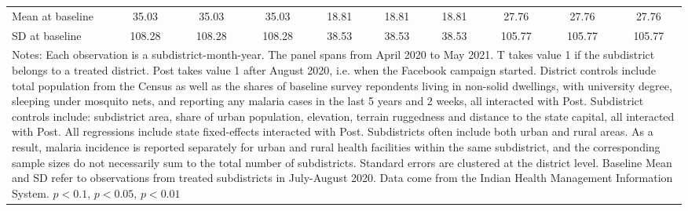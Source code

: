 {{\begin{tabular}{l*{9}{c}}
Mean at baseline&    35.03         &    35.03         &    35.03         &    18.81         &    18.81         &    18.81         &    27.76         &    27.76         &    27.76         \\
SD at baseline  &   108.28         &   108.28         &   108.28         &    38.53         &    38.53         &    38.53         &   105.77         &   105.77         &   105.77         \\
\hline\hline
\multicolumn{10}{p{0.92\linewidth}}{\scriptsize Notes: Each observation is a subdistrict-month-year. The panel spans from April 2020 to May 2021. T takes value 1 if the subdistrict belongs to a treated district. Post takes value 1 after August 2020, i.e. when the Facebook campaign started.  District controls include total population from the Census as well as the shares of baseline survey repondents living in non-solid dwellings, with university degree, sleeping under mosquito nets, and reporting any malaria cases in the last 5 years and 2 weeks, all interacted with Post. Subdistrict controls include: subdistrict area, share of urban population, elevation, terrain ruggedness and distance to the state capital, all interacted with Post. All regressions include state fixed-effects interacted with Post. Subdistricts often include both urban and rural areas. As a result, malaria incidence is reported separately for urban and rural health facilities within the same subdistrict, and the corresponding sample sizes do not necessarily sum to the total number of subdistricts. Standard errors are clustered at the district level. Baseline Mean and SD refer to observations from treated subdistricts in July-August 2020. Data come from the Indian Health Management Information System. \sym{*} \(p<0.1\), \sym{**} \(p<0.05\), \sym{***} \(p<0.01\)}\\
\end{tabular}
}%

}

